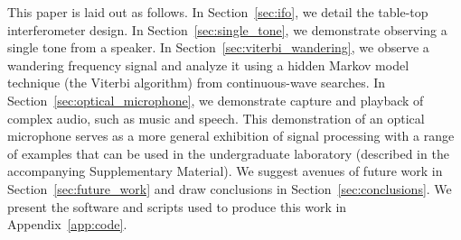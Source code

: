 \documentclass[paper-main.tex]{subfiles}
\begin{document}
This paper is laid out as follows. 
In Section~\ref{sec:ifo}, we detail the table-top interferometer design. 
In Section~\ref{sec:single_tone}, we demonstrate observing a single tone from a speaker. 
In Section~\ref{sec:viterbi_wandering}, we observe a wandering frequency signal and analyze it using a hidden Markov model technique (the Viterbi algorithm) from continuous-wave searches. 
In Section~\ref{sec:optical_microphone}, we demonstrate capture and playback of complex audio, such as music and speech.
This demonstration of an optical microphone serves as a more general exhibition of signal processing with a range of examples that can be used in the undergraduate laboratory (described in the accompanying Supplementary Material). 
We suggest avenues of future work in Section~\ref{sec:future_work} and draw conclusions in Section~\ref{sec:conclusions}. 
We present the software and scripts used to produce this work in Appendix~\ref{app:code}.
\end{document}

